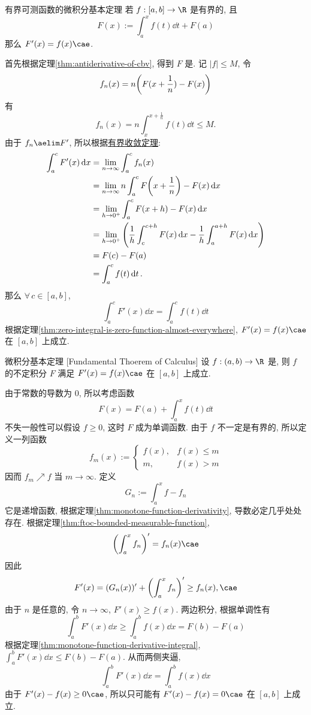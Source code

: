 \begin{thm}
    {有界可测函数的微积分基本定理}
    若 \(f:[a,b]\to\R\) 是有界的\MeasurableFunc{}, 且
    \[F(x):=\int_a^x f(t)\dd{t} + F(a)\]
    那么 \(F'(x)=f(x)\cae\).
\end{thm}
\begin{prf}
    首先根据定理\ref{thm:antiderivative-of-cbv}, 得到 \(F\) 是\BVFunc{}. 记 \(|f|\leq M\), 令
    \[f_n(x)=n\qty(F(x+\frac{1}{n})-F(x))\]
    有
    \[f_n(x)=n\int_x^{x+\frac{1}{n}} f(t)\dd{t}\leq M.\]
    由于 \(f_n\aelim F'\), 所以根据\hyperref[thm:bct]{有界收敛定理}:
    \begin{align*}
        \int_a^c F'(x)\dd{x} &=\lim_{n\to\infty}\int_a^c f_n(x) \\
        &=\lim_{n\to\infty}n\int_{a}^{c}F\qty(x+\frac{1}{n})-F(x)\dd{x} \\
        &=\lim_{h\to 0^+}\int_{a}^{c}F(x+h)-F(x)\dd{x} \\
        &=\lim_{h\to 0^+}\qty(\frac{1}{h}\int_{c}^{c+h} F(x)\dd{x}-\frac{1}{h}\int_{a}^{a+h} F(x)\dd{x}) \\
        &= F(c) - F(a)\\
        &= \int_a^c f(t)\dd{t}.
    \end{align*}
    那么 \(\forall\,c\in [a,b]\), 
    \[\int_a^c F'(x)\dd{x} = \int_a^c f(t)\dd{t}\]
    根据定理\ref{thm:zero-integral-is-zero-function-almost-everywhere}, \(F'(x)=f(x)\cae\) 在 \([a,b]\) 上成立.
\end{prf}
\begin{thm}
    [ftoc]
    {微积分基本定理}
    [Fundamental Thoerem of Calculus]
    设 \(f:(a,b)\to\R\) 是\IntegrableFunc{}, 则 \(f\) 的不定积分 \(F\) 满足 \(F'(x)=f(x)\cae\) 在 \([a,b]\) 上成立.
\end{thm}
\begin{prf}
    由于常数的导数为 0, 所以考虑函数
    \[F(x)=F(a)+\int_a^x f(t)\dd{t}\]
    不失一般性可以假设 \(f\geq 0\), 这时 \(F\) 成为单调函数. 由于 \(f\) 不一定是有界的, 所以定义一列函数
    \[f_m(x):=\begin{cases}
    f(x), & f(x)\leq m \\
    m, & f(x)>m
    \end{cases}\]
    因而 \(f_m\nearrow f\) 当 \(m\to\infty\). 定义
    \[G_n:=\int_a^x f-f_n\]
    它是递增函数, 根据定理\ref{thm:monotone-function-derivativity}, 导数必定几乎处处存在. 根据定理\ref{thm:ftoc-bounded-measurable-function}, 
    \[\qty(\int_a^x f_n)'=f_n(x)\cae\]
    因此
    \[F'(x)=(G_n(x))'+\qty(\int_a^x f_n)'\geq f_n(x), \cae\]
    由于 \(n\) 是任意的, 令 \(n\to\infty\), \(F'(x)\geq f(x)\). 两边积分, 根据单调性有
    \[\int_a^b F'(x)\dd{x}\geq \int_a^b f(x)\dd{x} = F(b)-F(a)\]
    根据定理\ref{thm:monotone-function-derivative-integral}, \(\int_a^b F'(x)\dd{x}\leq F(b)-F(a)\). 从而两侧夹逼,
    \[\int_a^b F'(x)\dd{x} = \int_a^b f(x)\dd{x}\]
    由于 \(F'(x)-f(x)\geq 0\cae\), 所以只可能有 \(F'(x)-f(x)=0\cae\) 在 \([a,b]\) 上成立.
\end{prf}
